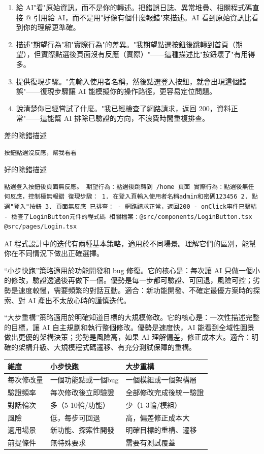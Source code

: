 \begin{enumerate}
  \item 給 AI"看"原始資訊，而不是你的轉述。把錯誤日誌、異常堆疊、相關程式碼直接 @ 引用給 AI，而不是用"好像有個什麼報錯"來描述。AI 看到原始資訊比看到你的理解更準確。
  \item 描述"期望行為"和"實際行為"的差異。"我期望點選按鈕後跳轉到首頁（期望），但實際點選後頁面沒有反應（實際）"——這種描述比"按鈕壞了"有用得多。
  \item 提供復現步驟。"先輸入使用者名稱，然後點選登入按鈕，就會出現這個錯誤"——復現步驟讓 AI 能模擬你的操作路徑，更容易定位問題。
  \item 說清楚你已經嘗試了什麼。"我已經檢查了網路請求，返回 200，資料正常"——這能幫 AI 排除已驗證的方向，不浪費時間重複排查。
\end{enumerate}

差的除錯描述

\begin{lstlisting}
按鈕點選沒反應，幫我看看
\end{lstlisting}

好的除錯描述

\begin{lstlisting}
點選登入按鈕後頁面無反應。 期望行為：點選後跳轉到 /home 頁面 實際行為：點選後無任何反應，控制檯無報錯 復現步驟： 1. 在登入頁輸入使用者名稱admin和密碼123456 2. 點選"登入"按鈕 3. 頁面無反應 已排查： - 網路請求正常，返回200 - onClick事件已繫結 - 檢查了LoginButton元件的程式碼 相關檔案：@src/components/LoginButton.tsx @src/pages/Login.tsx
\end{lstlisting}


AI 程式設計中的迭代有兩種基本策略，適用於不同場景。理解它們的區別，能幫你在不同情況下做出正確選擇。

“小步快跑”策略適用於功能開發和 bug 修復。它的核心是：每次讓 AI 只做一個小的修改，驗證透過後再做下一個。優勢是每一步都可驗證、可回退，風險可控；劣勢是速度較慢，需要頻繁的對話互動。適合：新功能開發、不確定最優方案時的探索、對 AI 產出不太放心時的謹慎迭代。

“大步重構”策略適用於明確知道目標的大規模修改。它的核心是：一次性描述完整的目標，讓 AI 自主規劃和執行整個修改。優勢是速度快，AI 能看到全域性圖景做出更優的架構決策；劣勢是風險高，如果 AI 理解偏差，修正成本大。適合：明確的架構升級、大規模程式碼遷移、有充分測試保障的重構。

\begin{center}
\begin{tabularx}{\linewidth}{|X|X|X|}
\hline
\textbf{維度} & \textbf{小步快跑} & \textbf{大步重構} \tabularnewline
\hline
每次修改量 & 一個功能點或一個bug & 一個模組或一個架構層 \tabularnewline
驗證頻率 & 每次修改後立即驗證 & 全部修改完成後統一驗證 \tabularnewline
對話輪次 & 多（5-10輪/功能） & 少（1-3輪/模組） \tabularnewline
風險 & 低，每步可回退 & 高，偏差修正成本大 \tabularnewline
適用場景 & 新功能、探索性開發 & 明確目標的重構、遷移 \tabularnewline
前提條件 & 無特殊要求 & 需要有測試覆蓋 \tabularnewline
\hline
\end{tabularx}
\end{center}

